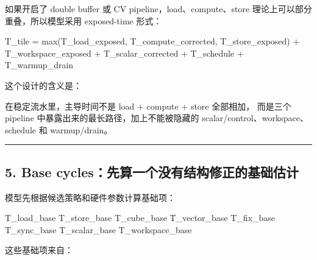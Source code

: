 \documentclass[
  10pt,
]{article}
\newenvironment{Shaded}{}{}
\newcommand{\NormalTok}[1]{#1}
\begin{document}
如果开启了 double buffer 或 CV pipeline，load、compute、store
理论上可以部分重叠，所以模型采用 exposed-time 形式：

\begin{Shaded}
\begin{Highlighting}[]
\NormalTok{T\_tile =}
\NormalTok{    max(T\_load\_exposed, T\_compute\_corrected, T\_store\_exposed)}
\NormalTok{  + T\_workspace\_exposed}
\NormalTok{  + T\_scalar\_corrected}
\NormalTok{  + T\_schedule}
\NormalTok{  + T\_warmup\_drain}
\end{Highlighting}
\end{Shaded}

这个设计的含义是：

\begin{Shaded}
\begin{Highlighting}[]
\NormalTok{在稳定流水里，主导时间不是 load + compute + store 全部相加，}
\NormalTok{而是三个 pipeline 中暴露出来的最长路径，加上不能被隐藏的 scalar/control、workspace、schedule 和 warmup/drain。}
\end{Highlighting}
\end{Shaded}

\begin{center}\rule{0.5\linewidth}{0.5pt}\end{center}

\subsection{5. Base
cycles：先算一个没有结构修正的基础估计}\label{base-cyclesux5148ux7b97ux4e00ux4e2aux6ca1ux6709ux7ed3ux6784ux4feeux6b63ux7684ux57faux7840ux4f30ux8ba1}

模型先根据候选策略和硬件参数计算基础项：

\begin{Shaded}
\begin{Highlighting}[]
\NormalTok{T\_load\_base}
\NormalTok{T\_store\_base}
\NormalTok{T\_cube\_base}
\NormalTok{T\_vector\_base}
\NormalTok{T\_fix\_base}
\NormalTok{T\_sync\_base}
\NormalTok{T\_scalar\_base}
\NormalTok{T\_workspace\_base}
\end{Highlighting}
\end{Shaded}

这些基础项来自：
\end{document}
